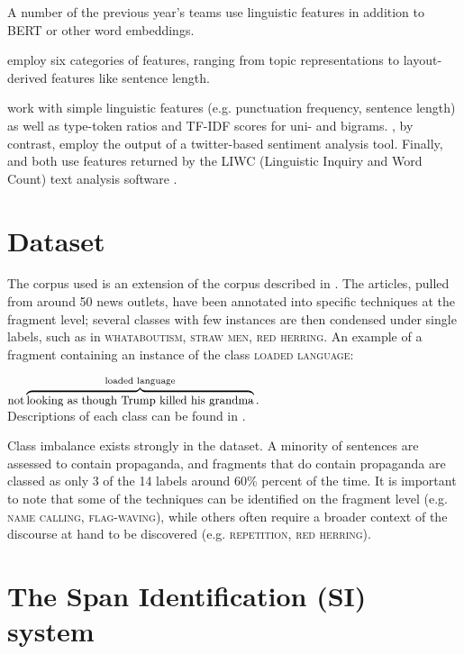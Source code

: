 \documentclass[11pt]{article}
\begin{document}
A number of the previous year's teams use linguistic features in addition to BERT or other word embeddings. 

 employ six categories of features, ranging from topic representations to layout-derived features like sentence length. 

 work with simple linguistic features (e.g. punctuation frequency, sentence length) as well as type-token ratios and TF-IDF scores for uni- and bigrams. 
, by contrast, employ the output of a twitter-based sentiment analysis tool.
Finally,  and  both use features returned by the LIWC (Linguistic Inquiry and Word Count) text analysis software \cite{pennebaker2001linguistic}. 


\section{Dataset}\label{dataset}
The corpus used is an extension of the corpus described in . 
The articles, pulled from around 50 news outlets, have been annotated into specific techniques at the fragment level; several classes with few instances are then condensed under single labels, such as in \textsc{whataboutism, straw men, red herring}. 
An example of a fragment containing an instance of the class \textsc{loaded language}:

\vspace{-0.7em}
{
\centering
$\text{\small not} \overbrace{\text{\small looking as though Trump killed his grandma}}^\text{loaded language}\text{\small.}$
\\
}
Descriptions of each class can be found in . 

Class imbalance exists strongly in the dataset. 
A minority of sentences are assessed to contain propaganda, and fragments that do contain propaganda are classed as only 3 of the 14 labels around 60\% percent of the time. 
It is important to note that some of the techniques can be identified on the fragment level  (e.g. \textsc{name calling, flag-waving}), 
while others often require a broader context of the discourse at hand to be discovered (e.g. \textsc{repetition, red herring}).




\section{The Span Identification (SI) system}
\end{document}
